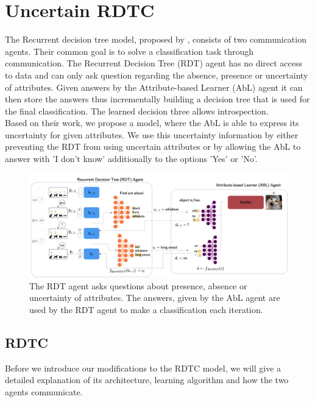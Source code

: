 \documentclass[a4paper,cleardoubleempty,BCOR1cm, 11pt]{report}
\begin{document}
\chapter{Uncertain RDTC} %
The Recurrent decision tree model, proposed by \citet{alaniz2019explainable}, consists of two communication agents. Their common goal is to solve a classification task through communication. The Recurrent Decision Tree (RDT) agent has no direct access to data and can only ask question regarding the absence, presence or uncertainty of attributes. Given answers by the Attribute-based Learner (AbL) agent it can then store the answers thus incrementally building a decision tree that is used for the final classification. The learned decision three allows introspection.\\
Based on their work, we propose a model, where the AbL is able to express its uncertainty for given attributes. We use this uncertainty information by either preventing the RDT from using uncertain attributes or by allowing the AbL to answer with 'I don't know' additionally to the options 'Yes' or 'No'. 



\begin{figure}
	\centering
	\includegraphics[width=1\textwidth]{images/uncertaintRDTC.pdf} 
	\caption{The RDT agent asks questions about presence, absence or uncertainty of attributes. The answers, given by the AbL agent are used by the RDT agent to make a classification each iteration.}
	\label{fig:uncertainRDTC}
\end{figure}

\section{RDTC} 
Before we introduce our modifications to the RDTC model, we will give a detailed explanation of its architecture, learning algorithm and how the two agents communicate.

\end{document}
